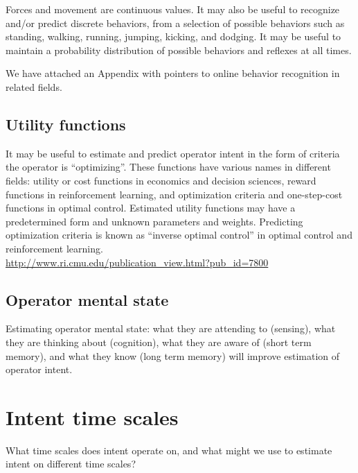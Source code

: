 \documentclass[letterpaper,12pt,fullpage]{article}
\begin{document}
Forces and movement are continuous values. It may also be useful to
recognize and/or predict discrete behaviors, from a selection of
possible behaviors such as 
standing, walking,
running, jumping, kicking, and dodging.
It may be useful to maintain a probability distribution of possible
behaviors and reflexes at all times.

We have attached an Appendix with pointers to online behavior
recognition in related fields.

\subsection{Utility functions}

It may be useful to estimate and predict operator intent in the form
of criteria the operator is ``optimizing''. These functions have
various names in different fields: utility or cost functions in economics
and decision sciences,
reward functions in reinforcement learning, and
optimization criteria and one-step-cost functions in optimal control.
Estimated utility functions may have a predetermined form and unknown
parameters and weights.
Predicting optimization criteria is known as ``inverse optimal control''
in optimal control and reinforcement learning.\\
\url{http://www.ri.cmu.edu/publication_view.html?pub_id=7800}

\subsection{Operator mental state}

Estimating operator mental state: what they are attending to (sensing),
what they are thinking about (cognition), what they are aware of (short term
memory), and what
they know (long term memory) will improve estimation of operator intent.

\section{Intent time scales}

What time scales does intent operate on, and what might we use
to estimate intent on different time scales?
\end{document}
